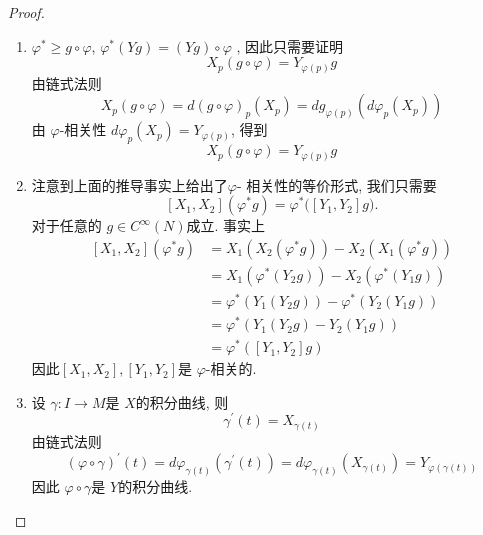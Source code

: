 \documentclass[../main.tex]{subfiles}
\begin{document}
\begin{proof}
    \begin{enumerate}
        \item \(   \varphi ^{*}\ge g\circ  \varphi   \), \(   \varphi ^{*}\left( Yg \right)= \left( Yg \right)\circ  \varphi     \)  , 因此只需要证明 \[
        X_{p}\left( g\circ  \varphi  \right)= Y_{ \varphi \left( p \right) }g 
        \]由链式法则 \[
        X_{p}\left( g\circ  \varphi  \right)= d\left( g\circ  \varphi  \right)_{p}\left( X_{p} \right)= dg_{ \varphi \left( p \right) }\left( d \varphi _{p}\left( X_{p} \right)  \right)    
        \]由 \(   \varphi   \)-相关性 \(  d \varphi _{p}\left( X_{p} \right)= Y_{ \varphi \left( p \right) }   \), 得到 \[
        X_{p}\left( g\circ  \varphi  \right)= Y_{ \varphi \left( p \right) }g 
        \]  
        \item 注意到上面的推导事实上给出了\(   \varphi   \)- 相关性的等价形式, 我们只需要$$[X_1,X_2](\varphi^*g)=\varphi^*\big([Y_1,Y_2]g\big).$$ 对于任意的 \(  g\in C^{\infty}\left( N \right)   \)成立. 事实上  \[
       \begin{aligned}
        [X_1,X_2]\left(  \varphi ^{*}g \right) &= X_1\left( X_2\left(  \varphi ^{*}g \right)  \right)-X_2\left( X_1\left(  \varphi ^{*}g \right)  \right)\\ 
         &= X_1\left(  \varphi ^{*}\left( Y_2g \right)  \right)-X_2\left(  \varphi ^{*}\left( Y_1g \right)  \right)\\ 
          &=  \varphi ^{*}\left( Y_1\left( Y_2g \right)  \right)- \varphi ^{*}\left( Y_2\left( Y_1g \right)  \right)    \\ 
           &=  \varphi ^{*}\left( Y_1\left( Y_2g \right)-Y_2\left( Y_1g \right)   \right)\\ 
            &=  \varphi ^{*}\left( [Y_1,Y_2]g \right)     
       \end{aligned}
        \]因此\(  [X_1,X_2],[Y_1,Y_2]  \)是 \(   \varphi   \)-相关的.
        \item 设 \(   \gamma :I\to M  \)是 \(  X  \)的积分曲线, 则 \[
         \gamma ^{\prime} \left( t \right)= X_{ \gamma \left( t \right) } 
        \]   由链式法则 \[
        \left(  \varphi \circ  \gamma  \right)^{\prime} \left( t \right)= d  \varphi _{ \gamma \left( t \right) }\left(  \gamma ^{\prime} \left( t \right)  \right)= d  \varphi _{ \gamma \left( t \right) }\left( X_{ \gamma \left( t \right) }\right)    = Y_{ \varphi \left(  \gamma \left( t \right)  \right) } 
        \]因此 \(   \varphi \circ  \gamma   \)是 \(  Y  \)的积分曲线.  
    \end{enumerate}
    
\end{proof}
\end{document}
